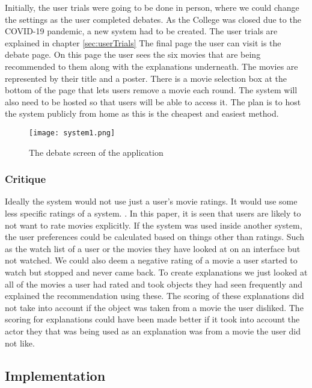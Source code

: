                     Initially, the user trials were going to be done in person, where we could change the settings as the user completed debates. As the College was closed due to the COVID-19 pandemic, a new system had to be created. The user trials are explained in chapter \ref{sec:userTrials} The final page the user can visit is the debate page. On this page the user sees the six movies that are being recommended to them along with the explanations underneath. The movies are represented by their title and a poster.  There is a movie selection box at the bottom of the page that lets users remove a movie each round. The system will also need to be hosted so that users will be able to access it. The plan is to host the system publicly from home as this is the cheapest and easiest method. 

        
                    \begin{figure}
                        \texttt{[image: system1.png]}
                        \caption{The debate screen of the application}
                    \end{figure}

        
                    \subsubsection{Critique}
                        Ideally the system would not use just a user's movie ratings. It would use some less specific ratings of a system. \cite{10.1145/1555400.1555432}. In this paper, it is seen that users are likely to not want to rate movies explicitly. If the system was used inside another system, the user preferences could be calculated based on things other than ratings. Such as the watch list of a user or the movies they have looked at on an interface but not watched. We could also deem a negative rating of a movie a user started to watch but stopped and never came back. To create explanations we just looked at all of the movies a user had rated and took objects they had seen frequently and explained the recommendation using these. The scoring of these explanations did not take into account if the object was taken from a movie the user disliked. The scoring for explanations could have been made better if it took into account the actor they that was being used as an explanation was from a movie the user did not like.

            \subsection{Implementation}
